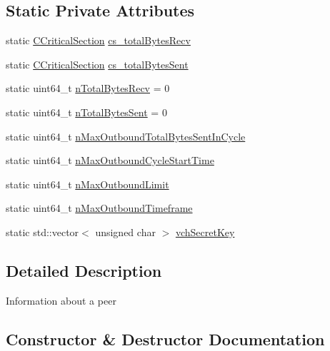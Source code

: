 \subsection*{Static Private Attributes}
\begin{DoxyCompactItemize}
\item 
static \mbox{\hyperlink{sync_8h_a37a4692b2d517f2843655ca11af7668a}{C\+Critical\+Section}} \mbox{\hyperlink{class_c_node_aeb01a001309560cdb85dc11b79afc353}{cs\+\_\+total\+Bytes\+Recv}}
\item 
static \mbox{\hyperlink{sync_8h_a37a4692b2d517f2843655ca11af7668a}{C\+Critical\+Section}} \mbox{\hyperlink{class_c_node_af5c55c4e76ec7f51569c07d8a39f37c6}{cs\+\_\+total\+Bytes\+Sent}}
\item 
static uint64\+\_\+t \mbox{\hyperlink{class_c_node_a06a81030d19c4be63d34a86074a00525}{n\+Total\+Bytes\+Recv}} = 0
\item 
static uint64\+\_\+t \mbox{\hyperlink{class_c_node_a9e512a5ae6ee721148cac7f10e3da95a}{n\+Total\+Bytes\+Sent}} = 0
\item 
static uint64\+\_\+t \mbox{\hyperlink{class_c_node_ac342da35cfc4816e19084b7ffa0b1e65}{n\+Max\+Outbound\+Total\+Bytes\+Sent\+In\+Cycle}}
\item 
static uint64\+\_\+t \mbox{\hyperlink{class_c_node_a23ae309020aa57a9938735cb18ea9962}{n\+Max\+Outbound\+Cycle\+Start\+Time}}
\item 
static uint64\+\_\+t \mbox{\hyperlink{class_c_node_a1685b3cdac760f9293ed9ea2daa5445e}{n\+Max\+Outbound\+Limit}}
\item 
static uint64\+\_\+t \mbox{\hyperlink{class_c_node_ae1df9c7700082b0968bff5f6baae023b}{n\+Max\+Outbound\+Timeframe}}
\item 
static std\+::vector$<$ unsigned char $>$ \mbox{\hyperlink{class_c_node_aa272d1c4ece395f04c01bdf3734900ab}{vch\+Secret\+Key}}
\end{DoxyCompactItemize}


\subsection{Detailed Description}
Information about a peer 

\subsection{Constructor \& Destructor Documentation}
\mbox{\label{class_c_node_abcec47da0b91ebbff6f0f123dbf2dba5}} 
